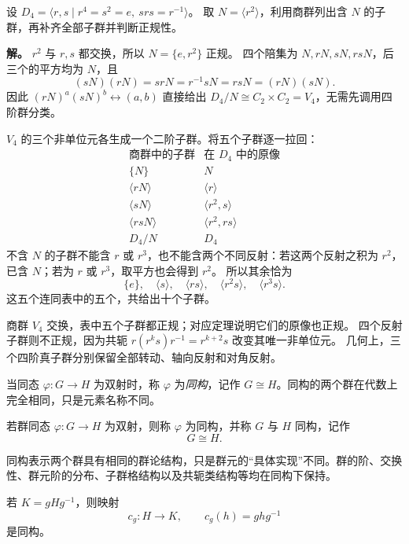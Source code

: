 \begin{example}
设 $D_4=\langle r,s\mid r^4=s^2=e,\ srs=r^{-1}\rangle$。
取 $N=\langle r^2\rangle$，利用商群列出含 $N$ 的子群，再补齐全部子群并判断正规性。

\textbf{解。} $r^2$ 与 $r,s$ 都交换，所以 $N=\{e,r^2\}$ 正规。
四个陪集为 $N,rN,sN,rsN$，后三个的平方均为 $N$，且
\[
(sN)(rN)=srN=r^{-1}sN=rsN=(rN)(sN).
\]
因此 $(rN)^a(sN)^b\leftrightarrow(a,b)$ 直接给出
$D_4/N\cong C_2\times C_2=V_4$，无需先调用四阶群分类。

$V_4$ 的三个非单位元各生成一个二阶子群。将五个子群逐一拉回：
\[
\begin{array}{c|c}
\text{商群中的子群}&\text{在 }D_4\text{ 中的原像}\\\hline
\{N\}&N\\
\langle rN\rangle&\langle r\rangle\\
\langle sN\rangle&\langle r^2,s\rangle\\
\langle rsN\rangle&\langle r^2,rs\rangle\\
D_4/N&D_4
\end{array}
\]
不含 $N$ 的子群不能含 $r$ 或 $r^3$，也不能含两个不同反射：若这两个反射之积为 $r^2$，已含 $N$；若为 $r$ 或 $r^3$，取平方也会得到 $r^2$。
所以其余恰为
\[
\{e\},\quad\langle s\rangle,\quad\langle rs\rangle,
\quad\langle r^2s\rangle,\quad\langle r^3s\rangle.
\]
这五个连同表中的五个，共给出十个子群。

商群 $V_4$ 交换，表中五个子群都正规；对应定理说明它们的原像也正规。
四个反射子群则不正规，因为共轭
$r(r^ks)r^{-1}=r^{k+2}s$ 改变其唯一非单位元。
几何上，三个四阶真子群分别保留全部转动、轴向反射和对角反射。
\end{example}


当同态 $\varphi:G\to H$ 为双射时，称 $\varphi$ 为\emph{同构}，记作 $G\cong H$。同构的两个群在代数上完全相同，只是元素名称不同。

\begin{definition}[同构]
若群同态 $\varphi:G\to H$ 为双射，则称 $\varphi$ 为同构，并称 $G$ 与 $H$ 同构，记作
\[
G\cong H.
\]
\label{def:isomorphism}
\end{definition}

同构表示两个群具有相同的群论结构，只是群元的“具体实现”不同。群的阶、交换性、群元阶的分布、子群格结构以及共轭类结构等均在同构下保持。

\begin{proposition}[共轭子群同构]
若 $K=gHg^{-1}$，则映射
\[
c_g:H\to K,
\qquad
c_g(h)=ghg^{-1}
\]
是同构。
\label{prop:conjugate-subgroups-isomorphic}

\end{proposition}

